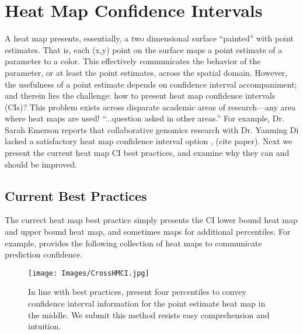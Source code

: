 \section{Heat Map Confidence Intervals}

A heat map presents, essentially, a two dimensional surface ``painted'' with point estimates. That is, each (x,y) point on the surface maps a point estimate of a parameter to a color. This effectively communicates the behavior of the parameter, or at least the point estimates, across the spatial domain. However, the usefulness of a point estimate depends on confidence interval accompaniment; and therein lies the challenge: how to present heat map confidence intervals (CIs)? This problem exists across disparate academic areas of research---any area where heat maps are used! ``...question asked in other areas.'' For example, Dr. Sarah Emerson reports that collaborative genomics research with Dr. Yanming Di lacked a satisfactory heat map confidence interval option \citep{Emerson}, (cite paper). Next we present the current heat map CI best practices, and examine why they can and should be improved.

\subsection{Current Best Practices}

The currect heat map best practice simply presents the CI lower bound heat map and upper bound heat map, and sometimes maps for additional percentiles. For example, \cite{Cross2015} provides the following collection of heat maps to communicate prediction confidence.

  \begin{figure}[H]
	\texttt{[image: Images/CrossHMCI.jpg]}
	\caption{In line with best practices, \cite{Cross2015} present four percentiles to convey confidence interval information for the point estimate heat map in the middle. We submit this method resists easy comprehension and intuition.}
	\end{figure}

